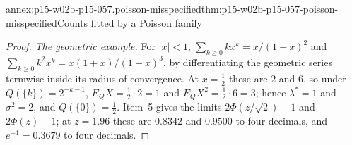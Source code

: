 \begin{annexitem}{annex:p15-w02b-p15-057.poisson-misspecified}{thm:p15-w02b-p15-057-poisson-misspecified}{Counts fitted by a Poisson family}
\begin{proof}
\emph{The geometric example.} For \(|x|<1\),
\(\sum_{k\geq0}kx^k=x/(1-x)^2\) and \(\sum_{k\geq0}k^2x^k=x(1+x)/(1-x)^3\),
by differentiating the geometric series termwise inside its radius of
convergence. At \(x=\frac12\) these are \(2\) and \(6\), so under
\(Q(\{k\})=2^{-k-1}\), \(E_QX=\frac12\cdot2=1\) and
\(E_QX^2=\frac12\cdot6=3\); hence \(\lambda^*=1\) and \(\sigma^2=2\), and
\(Q(\{0\})=\frac12\). Item~5 gives the limits \(2\Phi(z/\sqrt2)-1\) and
\(2\Phi(z)-1\); at \(z=1.96\) these are \(0.8342\) and \(0.9500\) to four
decimals, and \(e^{-1}=0.3679\) to four decimals.
\end{proof}
\end{annexitem}
